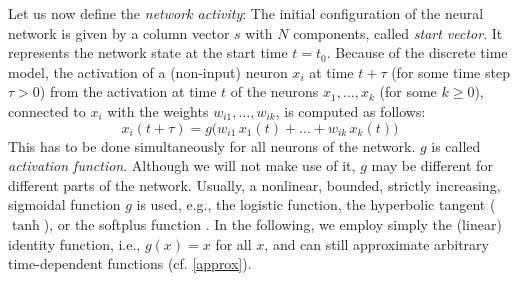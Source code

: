 \documentclass{sn-jnl}
\theoremstyle{definition}
\begin{document}

Let us now define the \emph{network activity}: The initial
configuration of the neural network is given by a column vector $s$ with $N$
components, called \emph{start vector}. It represents the network state at the
start time $t=t_0$. Because of the discrete time model, the activation
of a (non-input) neuron $x_i$ at time $t+\tau$ (for some time step $\tau>0$) from
the activation at time $t$ of the neurons $x_1,\dots,x_k$ (for some $k \ge 0$),
connected to $x_i$ with the weights $w_{i1},\dots,w_{ik}$, is computed as
follows:
\begin{equation}\label{recur}
	x_i(t+\tau) = g\big(w_{i1}\,x_1(t) +\dots+ w_{ik}\,x_k(t)\big)
\end{equation}
This has to be done simultaneously for all neurons of the network. $g$ is called
\emph{activation function}. Although we will not make use of it,
$g$ may be different for different parts of the network.
Usually, a nonlinear, bounded, strictly increasing, sigmoidal function $g$ is
used, e.g., the logistic function, the hyperbolic tangent ($\tanh$), or the
softplus function \citep[Section~3.10]{GBC16}. In the following, we employ simply
the (linear) identity function, i.e., $g(x)=x$ for all $x$, and can still
approximate arbitrary time-dependent functions (cf. \cref{approx}).
\end{document}
